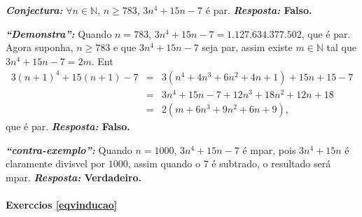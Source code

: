 \begin{enumerate}[{\bf 1.}]
\noindent \textit{\textbf{Conjectura:}} $\forall n\in\mathbb{N}$, $n\geq 783$, $3n^4+15n-7$ \'e par. {\bf{\it Resposta:} Falso.}

\noindent \textit{\textbf{``Demonstra\caoi'':}} Quando $n=783$, $3n^4+15n-7=1.127.634.377.502$, que \'e par. Agora suponha, $n\geq 783$ e que $3n^4+15n-7$ seja par, assim existe $m\in\mathbb{N}$ tal que $3n^4+15n-7=2m$. Ent\ao
\begin{eqnarray*}
3(n+1)^4+15(n+1)-7&=& 3(n^4+4n^3+6n^2+4n+1)+15n+15-7\\
                  &=& 3n^4+15n-7+12n^3+18n^2+12n+18 \\
                  &=& 2(m+6n^3+9n^2+6n+9),
\end{eqnarray*}  
que \'e par.   {\bf{\it Resposta:} Falso.}

\noindent \textit{\textbf{``contra-exemplo'':}} Quando $n=1000$, $3n^4+15n-7$ \'e \ih mpar, pois $3n^4+15n$ \'e claramente divis\ih vel por $1000$, assim quando o $7$ \'e subtra\ih do, o resultado ser\'a \ih mpar. {\bf{\it Resposta:} Verdadeiro.}
\end{enumerate}
\paragraph{Exerc\ih cios \ref{eqvinducao}}

